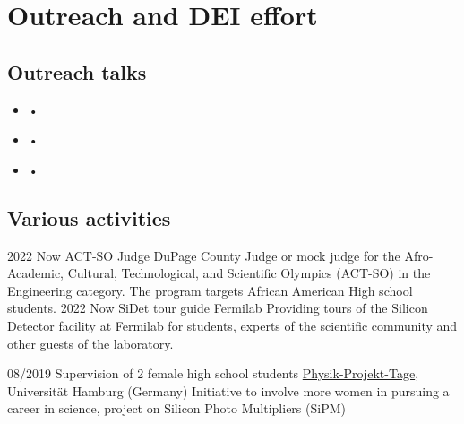 \ifacademic
  \section{Outreach and DEI effort}
  \subsection{Outreach talks}
\vskip 10pt

\begin{itemize}

\item  {} • ~

\item  {} • ~

\item  {} • ~

\end{itemize}

\subsection{Various activities}
\position
      {2022 \textemdash{} Now} 
      {ACT-SO Judge}
      {DuPage County}
      {Judge or mock judge for the Afro-Academic, Cultural, Technological, and Scientific Olympics (ACT-SO) in the Engineering category. The program targets African American High school students.}
     \position
      {2022 \textemdash{} Now} 
      {SiDet tour guide}
      {Fermilab}
      {Providing tours of the Silicon Detector facility at Fermilab for students, experts of the scientific community and other guests of the laboratory.}

	\position
      {08/2019} 
      {Supervision of 2 female high school students}
      {\href{https://www.ppt.uni-hamburg.de}{Physik-Projekt-Tage}, Universit\"{a}t Hamburg (Germany)}
      {Initiative to involve more women in pursuing a career in science, project on Silicon Photo Multipliers (SiPM)}
